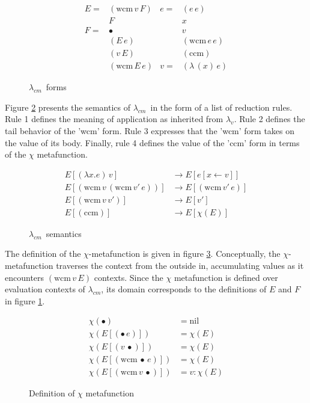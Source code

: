 \documentclass[ms,electronic,twosidetoc,letterpaper,chaptercenter,parttop]{byumsphd}
\newcommand{\lv}{$\lambda_v$}
\newcommand{\cm}{$\lambda_{cm}$}
\newcommand{\abs}[2]{(\lambda\,(#1)\,#2)}
\newcommand{\app}[2]{(#1\,#2)}
\newcommand{\wcm}[2]{(\mathrm{wcm}\,#1\,#2)}
\newcommand{\ccm}{(\mathrm{ccm})}
\newcommand{\hole}{\bullet}
\begin{document}
\begin{figure}
\begin{align*}
E = &\wcm{v}{F} & e = &\app{e}{e}\\
    &F          &     &x\\
F = &\hole      &     &v\\
    &\app{E}{e} &     &\wcm{e}{e}\\
    &\app{v}{E} &     &\ccm\\
    &\wcm{E}{e} & v = &\abs{x}{e}
\end{align*}
\caption{\cm\ forms}
\label{cm-language-forms}
\end{figure}

Figure \ref{cm-language-semantics} presents the semantics of \cm\ in the form of a list of
reduction rules. Rule 1 defines the meaning of application as inherited from \lv. Rule 2
defines the tail behavior of the \scheme'wcm' form. Rule 3 expresses that the \scheme'wcm'
form takes on the value of its body. Finally, rule 4 defines the value of the \scheme'ccm'
form in terms of the $\chi$ metafunction.

\begin{figure}
\begin{align*}
E[(\lambda x.e)\,v]     &\rightarrow E[e[x\leftarrow v]]\tag{1}\\
E[\wcm{v}{\wcm{v'}{e}}] &\rightarrow E[\wcm{v'}{e}]\tag{2}\\
E[\wcm{v}{v'}]          &\rightarrow E[v']\tag{3}\\
E[\ccm]                 &\rightarrow E[\chi(E)]\tag{4}
\end{align*}
\caption{\cm\ semantics}
\label{cm-language-semantics}
\end{figure}

The definition of the $\chi$-metafunction is given in figure \ref{cm-chi-metafunction}.
Conceptually, the $\chi$-metafunction traverses the context from the outside in,
accumulating values as it encounters $\wcm{v}{E}$ contexts. Since the $\chi$ metafunction
is defined over evaluation contexts of \cm, its domain corresponds to the definitions of
$E$ and $F$ in figure \ref{cm-language-forms}.

\begin{figure}
\begin{align*}
\chi(\hole)             &= \mathrm{nil}\\
\chi(E[\app{\hole}{e}]) &= \chi(E)\\
\chi(E[\app{v}{\hole}]) &= \chi(E)\\
\chi(E[\wcm{\hole}{e}]) &= \chi(E)\\
\chi(E[\wcm{v}{\hole}]) &= v : \chi(E)
\end{align*}
\caption{Definition of $\chi$ metafunction}
\label{cm-chi-metafunction}
\end{figure}
\end{document}

